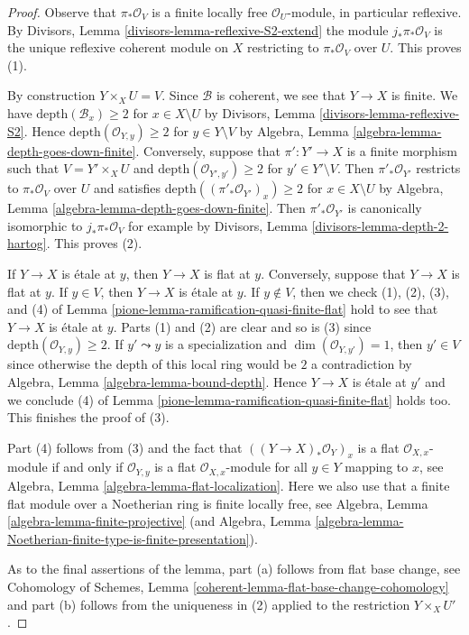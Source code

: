 \begin{proof}

Observe that $\pi_*\mathcal{O}_V$ is a finite locally free
$\mathcal{O}_U$-module, in particular reflexive.
By Divisors, Lemma \ref{divisors-lemma-reflexive-S2-extend}
the module $j_*\pi_*\mathcal{O}_V$ is the unique
reflexive coherent module on $X$ restricting to
$\pi_*\mathcal{O}_V$ over $U$. This proves (1).

\medskip\noindent
By construction $Y \times_X U = V$.
Since $\mathcal{B}$ is coherent, we see that $Y \to X$ is finite.
We have $\text{depth}(\mathcal{B}_x) \geq 2$ for $x \in X \setminus U$
by Divisors, Lemma \ref{divisors-lemma-reflexive-S2}.
Hence $\text{depth}(\mathcal{O}_{Y, y}) \geq 2$ for $y \in Y \setminus V$
by Algebra, Lemma \ref{algebra-lemma-depth-goes-down-finite}.
Conversely, suppose that $\pi' : Y' \to X$ is a finite morphism such that
$V = Y' \times_X U$ and $\text{depth}(\mathcal{O}_{Y', y'}) \geq 2$
for $y' \in Y' \setminus V$. Then $\pi'_*\mathcal{O}_{Y'}$
restricts to $\pi_*\mathcal{O}_V$ over $U$ and satisfies
$\text{depth}((\pi'_*\mathcal{O}_{Y'})_x) \geq 2$ for
$x \in X \setminus U$ by
Algebra, Lemma \ref{algebra-lemma-depth-goes-down-finite}.
Then $\pi'_*\mathcal{O}_{Y'}$ is canonically isomorphic
to $j_*\pi_*\mathcal{O}_V$ for example by
Divisors, Lemma \ref{divisors-lemma-depth-2-hartog}.
This proves (2).

\medskip\noindent
If $Y \to X$ is \'etale at $y$, then $Y \to X$ is flat at $y$.
Conversely, suppose that $Y \to X$ is flat at $y$.
If $y \in V$, then $Y \to X$ is \'etale at $y$.
If $y \not \in V$, then we check (1), (2), (3), and (4) of
Lemma \ref{pione-lemma-ramification-quasi-finite-flat} hold
to see that $Y \to X$ is \'etale at $y$. Parts (1) and (2)
are clear and so is (3) since $\text{depth}(\mathcal{O}_{Y, y}) \geq 2$.
If $y' \leadsto y$ is a specialization and $\dim(\mathcal{O}_{Y, y'}) = 1$,
then $y' \in V$ since otherwise the depth of this local ring
would be $2$ a contradiction by
Algebra, Lemma \ref{algebra-lemma-bound-depth}.
Hence $Y \to X$ is \'etale at $y'$ and we conclude (4) of
Lemma \ref{pione-lemma-ramification-quasi-finite-flat} holds too.
This finishes the proof of (3).

\medskip\noindent
Part (4) follows from (3) and the fact that $((Y \to X)_*\mathcal{O}_Y)_x$
is a flat $\mathcal{O}_{X, x}$-module if and only if $\mathcal{O}_{Y, y}$
is a flat $\mathcal{O}_{X, x}$-module for all $y \in Y$ mapping to $x$, see
Algebra, Lemma \ref{algebra-lemma-flat-localization}. Here we also
use that a finite flat module over a Noetherian ring is finite locally
free, see Algebra, Lemma \ref{algebra-lemma-finite-projective}
(and
Algebra, Lemma
\ref{algebra-lemma-Noetherian-finite-type-is-finite-presentation}).

\medskip\noindent
As to the final assertions of the lemma, part (a) follows from
flat base change, see
Cohomology of Schemes, Lemma \ref{coherent-lemma-flat-base-change-cohomology}
and part (b) follows from the uniqueness in (2) applied to the restriction
$Y \times_X U'$.
\end{proof}

